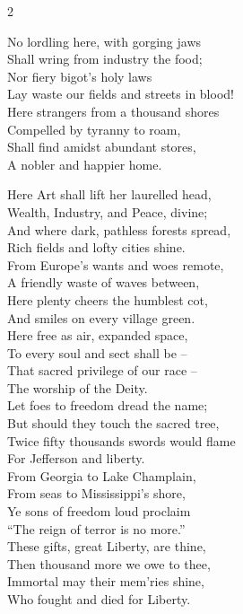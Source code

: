 \documentclass[10pt]{article}
\begin{document}
{\begin{minipage}{6.5in}
\begin{multicols}{2}
{      No lordling here, with gorging jaws \\
      Shall wring from industry the food; \\
      Nor fiery bigot's holy laws \\
      Lay waste our fields and streets in blood! \\
\bigskip
      Here strangers from a thousand shores \\
      Compelled by tyranny to roam, \\
      Shall find amidst abundant stores, \\
      A nobler and happier home. \\
\bigskip

      Here Art shall lift her laurelled head, \\
      Wealth, Industry, and Peace, divine; \\
      And where dark, pathless forests spread, \\
      Rich fields and lofty cities shine. \\
\bigskip
      From Europe's wants and woes remote, \\
      A friendly waste of waves between, \\
      Here plenty cheers the humblest cot, \\
      And smiles on every village green. \\
\bigskip
      Here free as air, expanded space, \\
      To every soul and sect shall be -- \\
      That sacred privilege of our race -- \\
      The worship of the Deity. \\
\bigskip
      Let foes to freedom dread the name; \\
      But should they touch the sacred tree, \\
      Twice fifty thousands swords would flame \\
      For Jefferson and liberty. \\
\bigskip
      From Georgia to Lake Champlain, \\
      From seas to Mississippi's shore, \\
      Ye sons of freedom loud proclaim \\
      ``The reign of terror is no more.'' \\
\bigskip
      These gifts, great Liberty, are thine, \\
      Then thousand more we owe to thee, \\
      Immortal may their mem'ries shine, \\
      Who fought and died for Liberty.
      
    }
    
  \end{multicols}
  
\end{minipage}
}
\end{document}
